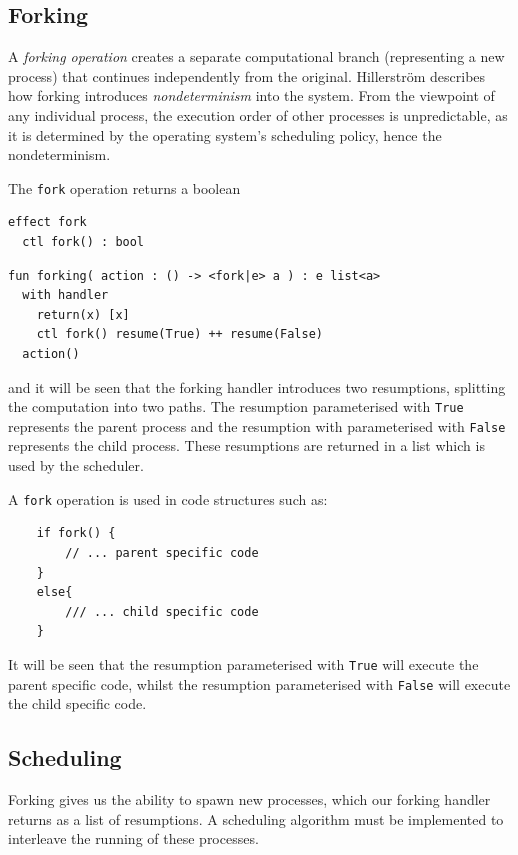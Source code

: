 \documentclass[logo,bsc,singlespacing,parskip]{infthesis}
\begin{document}
\subsection{Forking}
A \textit{forking operation} creates a separate computational branch (representing a new process) that continues independently from the original. Hillerström describes how forking introduces \textit{nondeterminism} into the system.  From the viewpoint of any individual process, the execution order of other processes is unpredictable, as it is determined by the operating system’s scheduling policy, hence the nondeterminism.

 

The \lstinline{fork} operation returns a boolean
\begin{lstlisting}
effect fork
  ctl fork() : bool     

\end{lstlisting}

\begin{lstlisting}
fun forking( action : () -> <fork|e> a ) : e list<a>
  with handler
    return(x) [x]
    ctl fork() resume(True) ++ resume(False)
  action()
\end{lstlisting}

and it will be seen that the forking handler introduces two resumptions, splitting the computation into two paths. The resumption parameterised with \lstinline{True} represents the parent process and the resumption with parameterised with \lstinline{False} represents the child process. These resumptions are returned in a list which is used by the scheduler. 

A \lstinline{fork} operation is used in code structures such as:
    \begin{lstlisting}
    if fork() {
        // ... parent specific code
    }
    else{
        /// ... child specific code
    }
    \end{lstlisting}

It will be seen that the resumption parameterised with \lstinline{True} will execute the parent specific code, whilst the resumption parameterised with \lstinline{False} will execute the child specific code.

\subsection{Scheduling}
Forking gives us the ability to spawn new processes, which our forking handler returns as a list of resumptions. A scheduling algorithm must be implemented to interleave the running of these processes.
\end{document}
